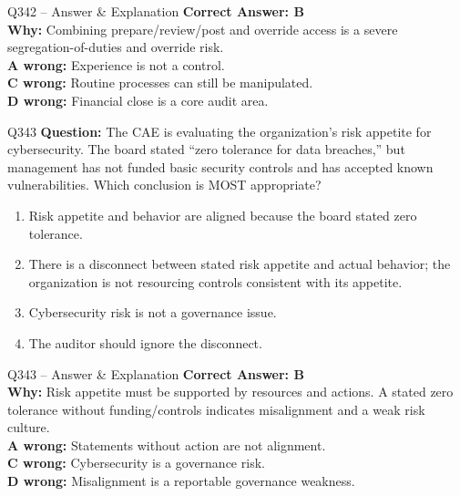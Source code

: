 \documentclass[aspectratio=169,10pt]{beamer}
\begin{document}
	\begin{frame}[t]{Q342 -- Answer \& Explanation}
		\small
		\textbf{Correct Answer: B} \\[4pt]
		\textbf{Why:} Combining prepare/review/post and override access is a severe segregation-of-duties and override risk. \\[4pt]
		\textbf{A wrong:} Experience is not a control. \\[2pt]
		\textbf{C wrong:} Routine processes can still be manipulated. \\[2pt]
		\textbf{D wrong:} Financial close is a core audit area.
	\end{frame}
	
	\begin{frame}[t]{Q343}
		\small
		\textbf{Question:} The CAE is evaluating the organization's risk appetite for cybersecurity. The board stated ``zero tolerance for data breaches,'' but management has not funded basic security controls and has accepted known vulnerabilities. Which conclusion is MOST appropriate?
		\begin{enumerate}[label=\Alph*.,itemsep=1pt,topsep=2pt]
			\item Risk appetite and behavior are aligned because the board stated zero tolerance.
			\item There is a disconnect between stated risk appetite and actual behavior; the organization is not resourcing controls consistent with its appetite.
			\item Cybersecurity risk is not a governance issue.
			\item The auditor should ignore the disconnect.
		\end{enumerate}
	\end{frame}
	
	\begin{frame}[t]{Q343 -- Answer \& Explanation}
		\small
		\textbf{Correct Answer: B} \\[4pt]
		\textbf{Why:} Risk appetite must be supported by resources and actions. A stated zero tolerance without funding/controls indicates misalignment and a weak risk culture. \\[4pt]
		\textbf{A wrong:} Statements without action are not alignment. \\[2pt]
		\textbf{C wrong:} Cybersecurity is a governance risk. \\[2pt]
		\textbf{D wrong:} Misalignment is a reportable governance weakness.
	\end{frame}
	
\end{document}
